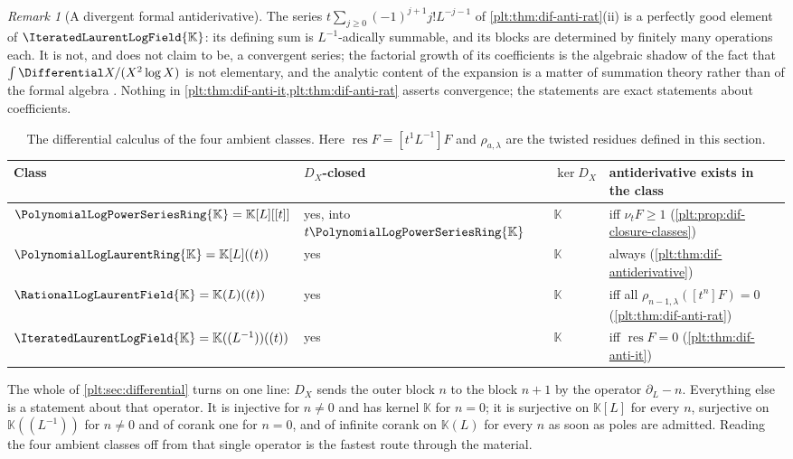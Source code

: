 \documentclass[11pt,oneside]{article}
\theoremstyle{plain}
\theoremstyle{definition}
\theoremstyle{remark}
\newtheorem{remark}[theorem]{Remark}
\newcommand{\K}{\mathbb{K}}
\newcommand{\PLpow}{\PolynomialLogPowerSeriesRing{\K}}   %
\newcommand{\PLlau}{\PolynomialLogLaurentRing{\K}}       %
\newcommand{\PLrat}{\RationalLogLaurentField{\K}}        %
\newcommand{\PLit}{\IteratedLaurentLogField{\K}}         %
\newcommand{\ordt}{\nu_{t}}                              %
\newcommand{\DX}{D_{X}}                                  %
\begin{document}
\begin{remark}[A divergent formal antiderivative]\label{plt:rmk:dif-borel}
The series \(t\sum_{j\ge0}(-1)^{j+1}j!L^{-j-1}\) of
\cref{plt:thm:dif-anti-rat}(ii) is a perfectly good element of \(\PLit\): its
defining sum is \(L^{-1}\)-adically summable, and its blocks are determined by
finitely many operations each.  It is not, and does not claim to be, a
convergent series; the factorial growth of its coefficients is the algebraic
shadow of the fact that \(\int\Differential X/(X^{2}\log X)\) is not
elementary, and the analytic content of the expansion is a matter of
summation theory rather than of the formal algebra
\cite{ecalle,costin-book}.  Nothing in
\cref{plt:thm:dif-anti-it,plt:thm:dif-anti-rat} asserts convergence; the
statements are exact statements about coefficients.
\end{remark}

\begin{table}[htbp]
\centering
\caption{The differential calculus of the four ambient classes.  Here
\(\operatorname{res}F=[t^{1}L^{-1}]F\) and \(\rho_{a,\lambda}\) are the twisted
residues defined in this section.}
\label{plt:tab:dif-classes}
\small
\begin{tabular}{@{}p{}p{}p{}p{}@{}}
\toprule
Class & \(\DX\)-closed & \(\ker\DX\) & antiderivative exists in the class \\
\midrule
\(\PLpow=\K[L][[t]]\) & yes, into \(t\PLpow\) & \(\K\) & iff \(\ordt F\ge1\)
  (\cref{plt:prop:dif-closure-classes}) \\
\(\PLlau=\K[L]((t))\) & yes & \(\K\) & always
  (\cref{plt:thm:dif-antiderivative}) \\
\(\PLrat=\K(L)((t))\) & yes & \(\K\) & iff all \(\rho_{n-1,\lambda}([t^{n}]F)
  =0\) (\cref{plt:thm:dif-anti-rat}) \\
\(\PLit=\K((L^{-1}))((t))\) & yes & \(\K\) & iff \(\operatorname{res}F=0\)
  (\cref{plt:thm:dif-anti-it}) \\
\bottomrule
\end{tabular}
\end{table}

\begin{checkpointbox}
The whole of \cref{plt:sec:differential} turns on one line: \(\DX\) sends the
outer block \(n\) to the block \(n+1\) by the operator \(\partial_{L}-n\).
Everything else is a statement about that operator.  It is injective for
\(n\ne0\) and has kernel \(\K\) for \(n=0\); it is surjective on \(\K[L]\) for
every \(n\), surjective on \(\K((L^{-1}))\) for \(n\ne0\) and of corank one for
\(n=0\), and of infinite corank on \(\K(L)\) for every \(n\) as soon as poles
are admitted.  Reading the four ambient classes off from that single operator
is the fastest route through the material.
\end{checkpointbox}
\end{document}

